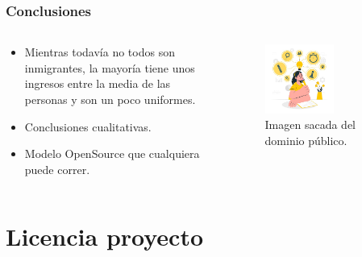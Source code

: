 \documentclass[17pt, t, lualatex]{beamer}
\begin{document}
\begin{frame}
  \frametitle{Conclusiones}
\begin{columns}
  \begin{column}{.5\textwidth}
\begin{itemize}
  \item Mientras todavía no todos son inmigrantes, la mayoría tiene unos ingresos entre la media de las personas y son un poco uniformes.
  \item Conclusiones cualitativas.
  \item Modelo OpenSource que cualquiera puede correr.
\end{itemize}    
  \end{column}

  \begin{column}{.5\textwidth}
\begin{figure}[ht]
      \centering
      \includegraphics[width = 0.6\textwidth]{img/img9.png}
      \caption{Imagen sacada del dominio público.}
    \end{figure}
  \end{column}
\end{columns}

  
\end{frame}






\section{Licencia proyecto}

\insertsectionpage
\end{document}
